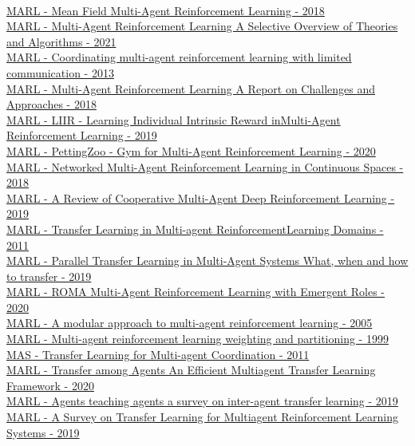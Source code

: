 \\
\href{http://proceedings.mlr.press/v80/yang18d.html}{MARL - Mean Field Multi-Agent Reinforcement Learning - 2018}
\\
\href{https://arxiv.org/abs/1911.10635}{MARL - Multi-Agent Reinforcement Learning A Selective Overview of Theories and Algorithms - 2021}
\\
\href{https://dl.acm.org/doi/abs/10.5555/2484920.2485093}{MARL - Coordinating multi-agent reinforcement learning with limited communication - 2013}
\\
\href{https://arxiv.org/abs/1807.09427}{MARL - Multi-Agent Reinforcement Learning A Report on Challenges and Approaches - 2018}
\\
\href{https://proceedings.neurips.cc/paper/2019/hash/07a9d3fed4c5ea6b17e80258dee231fa-Abstract.html}{MARL - LIIR - Learning Individual Intrinsic Reward inMulti-Agent Reinforcement Learning - 2019}
\\
\href{https://arxiv.org/abs/2009.14471}{MARL - PettingZoo - Gym for Multi-Agent Reinforcement Learning - 2020}
\\
\href{https://ieeexplore.ieee.org/abstract/document/8619581}{MARL - Networked Multi-Agent Reinforcement Learning in Continuous Spaces - 2018}
\\
\href{https://arxiv.org/abs/1908.03963}{MARL - A Review of Cooperative Multi-Agent Deep Reinforcement Learning - 2019}
\\
\href{https://link.springer.com/chapter/10.1007/978-3-642-29946-9_25}{MARL - Transfer Learning in Multi-agent ReinforcementLearning Domains - 2011}
\\
\href{https://ieeexplore.ieee.org/abstract/document/8851784}{MARL - Parallel Transfer Learning in Multi-Agent Systems What, when and how to transfer - 2019}
\\
\href{http://proceedings.mlr.press/v119/wang20f.html}{MARL - ROMA Multi-Agent Reinforcement Learning with Emergent Roles - 2020}
\\
\href{https://link.springer.com/chapter/10.1007/3-540-62934-3_39}{MARL - A modular approach to multi-agent reinforcement learning - 2005}
\\
\href{https://www.sciencedirect.com/science/article/pii/S0893608099000246}{MARL - Multi-agent reinforcement learning weighting and partitioning - 1999}
\\
\href{https://www.scitepress.org/Papers/2011/31856/}{MAS - Transfer Learning for Multi-agent Coordination - 2011}
\\
\href{https://arxiv.org/abs/2002.08030}{MARL - Transfer among Agents An Efficient Multiagent Transfer Learning Framework - 2020}
\\
\href{https://link.springer.com/article/10.1007/s10458-019-09430-0}{MARL - Agents teaching agents a survey on inter-agent transfer learning - 2019}
\\
\href{https://www.jair.org/index.php/jair/article/view/11396}{MARL - A Survey on Transfer Learning for Multiagent Reinforcement Learning Systems  - 2019}



